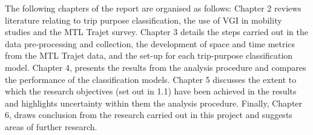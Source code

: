 The following chapters of the report are organised as follows:
Chapter 2 reviews literature relating to trip purpose classification, the use of VGI in mobility studies and the MTL Trajet survey.
Chapter 3 details the steps carried out in the data pre-processing and collection, the development of space and time metrics from the MTL Trajet data, and the set-up for each trip-purpose classification model.
Chapter 4, presents the results from the analysis procedure and compares the performance of the classification models.
Chapter 5 discusses the extent to which the research objectives (set out in 1.1) have been achieved in the results and highlights uncertainty within them the analysis procedure. Finally, Chapter 6, draws conclusion from the research carried out in this project and suggests areas of further research.
